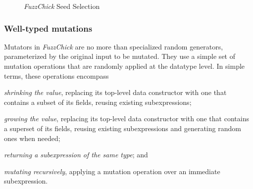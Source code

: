 \documentclass[acmsmall, anonymous]{acmart}
\newcommand{\fuzzchick}{\textit{FuzzChick}\xspace}
\begin{document}
\begin{figure}[t]
\begin{multicols}{2}

\begin{algorithm}[H]
  \SetInd{0em}{0.75em}
  \SetAlgoLined
  \DontPrintSemicolon
\caption{\label{algo:fuzzchick:loop}\fuzzchick Testing Loop}
\end{algorithm}

\columnbreak

\begin{algorithm}[H]
  \SetInd{0em}{0.75em}
  \SetAlgoLined
  \DontPrintSemicolon
\caption{\label{algo:fuzzchick:pick}\fuzzchick Seed Selection}
\end{algorithm}

\end{multicols}
\end{figure}

\subsubsection{Well-typed mutations}

Mutators in \fuzzchick are no more than specialized random generators,
parameterized by the original input to be mutated.
%
They use a simple set of mutation operations that are randomly applied at the
datatype level.
%
In simple terms, these operations encompass
%
\begin{inparaenum}
\item \emph{shrinking the value}, replacing its top-level data constructor with
  one that contains a subset of its fields, reusing existing subexpressions;
\item \emph{growing the value}, replacing its top-level data constructor with
  one that contains a superset of its fields, reusing existing subexpressions
  and generating random ones when needed;
\item \emph{returning a subexpression of the same type}; and
\item \emph{mutating recursively}, applying a mutation operation over an
  immediate subexpression.
\end{inparaenum}
\end{document}
